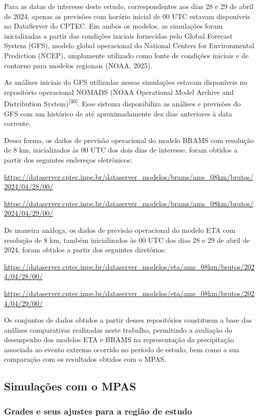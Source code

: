 \documentclass[12pt,a4paper,oneside]{book}
\begin{document}
Para as datas de interesse deste estudo, correspondentes aos dias 28 e 29 de abril de 2024, apenas as previsões com horário inicial de 00 UTC estavam disponíveis no DataServer do CPTEC. Em ambos os modelos, as simulações foram inicializadas a partir das condições iniciais fornecidas pelo Global Forecast System (GFS), modelo global operacional do National Centers for Environmental Prediction (NCEP), amplamente utilizado como fonte de condições iniciais e de contorno para modelos regionais (NOAA, 2025).

As análises iniciais do GFS utilizadas nessas simulações estavam disponíveis no repositório operacional NOMADS (NOAA Operational Model Archive and Distribution System)\textsuperscript{{[}30{]}}. Esse sistema disponibiliza as análises e previsões do GFS com um histórico de até aproximadamente dez dias anteriores à data corrente.

Dessa forma, os dados de previsão operacional do modelo BRAMS com resolução de 8 km, inicializados às 00 UTC dos dois dias de interesse, foram obtidos a partir dos seguintes endereços eletrônicos:

\url{https://dataserver.cptec.inpe.br/dataserver_modelos/brams/ams_08km/brutos/2024/04/28/00/}

\url{https://dataserver.cptec.inpe.br/dataserver_modelos/brams/ams_08km/brutos/2024/04/29/00/}

De maneira análoga, os dados de previsão operacional do modelo ETA com resolução de 8 km, também inicializados às 00 UTC dos dias 28 e 29 de abril de 2024, foram obtidos a partir dos seguintes diretórios:

\url{https://dataserver.cptec.inpe.br/dataserver\_modelos/eta/ams\_08km/brutos/2024/04/28/00/}

\url{https://dataserver.cptec.inpe.br/dataserver_modelos/eta/ams_08km/brutos/2024/04/29/00/}

Os conjuntos de dados obtidos a partir desses repositórios constituem a base das análises comparativas realizadas neste trabalho, permitindo a avaliação do desempenho dos modelos ETA e BRAMS na representação da precipitação associada ao evento extremo ocorrido no período de estudo, bem como a sua comparação com os resultados obtidos com o MPAS.

\subsection{Simulações com o MPAS}

\subsubsection{Grades e seus ajustes para a região de estudo}
\end{document}
